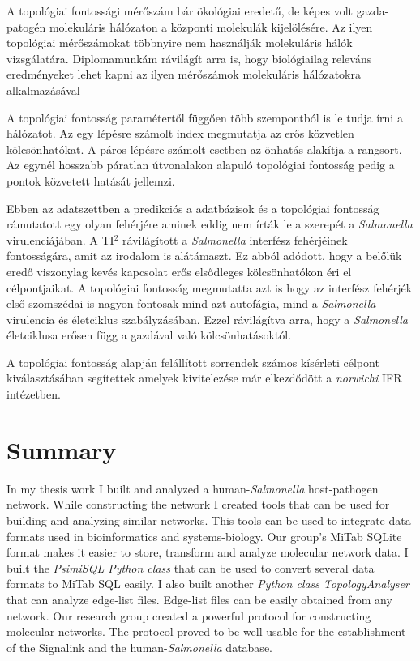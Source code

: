 \documentclass[a4paper,12pt]{article}
\begin{document}
		A topológiai fontossági mérőszám bár ökológiai eredetű, de képes volt gazda-patogén molekuláris hálózaton a központi molekulák kijelölésére. Az ilyen topológiai mérőszámokat többnyire nem használják molekuláris hálók vizsgálatára. Diplomamunkám rávilágít arra is, hogy biológiailag releváns eredményeket lehet kapni az ilyen mérőszámok molekuláris hálózatokra alkalmazásával
		
		A topológiai fontosság paramétertől függően több szempontból is le tudja írni a hálózatot. Az egy lépésre számolt index megmutatja az erős közvetlen kölcsönhatókat. A páros lépésre számolt esetben az önhatás alakítja a rangsort. Az egynél hosszabb páratlan útvonalakon alapuló topológiai fontosság pedig a pontok közvetett hatását jellemzi.
		
		Ebben az adatszettben a predikciós a adatbázisok és a topológiai fontosság rámutatott egy olyan fehérjére aminek eddig nem írták le a szerepét a \textit{Salmonella} virulenciájában. A TI$^2$ rávilágított a \textit{Salmonella} interfész fehérjéinek fontosságára, amit az irodalom is alátámaszt. Ez abból adódott, hogy a belőlük eredő viszonylag kevés kapcsolat erős elsődleges kölcsönhatókon éri el célpontjaikat. A topológiai fontosság megmutatta azt is hogy az interfész fehérjék első szomszédai is nagyon fontosak mind azt autofágia, mind a \textit{Salmonella} virulencia és életciklus szabályzásában. Ezzel rávilágítva arra, hogy a \textit{Salmonella} életciklusa erősen függ a gazdával való kölcsönhatásoktól.
		
		A topológiai fontosság alapján felállított sorrendek számos kísérleti célpont kiválasztásában segítettek amelyek kivitelezése már elkezdődött a \textit{norwichi} IFR intézetben.
		
		\pagebreak
		
		

\section{Summary}
		
		In my thesis work I built and analyzed a human-\textit{Salmonella} host-pathogen network. While constructing the network I created tools that can be used for building and analyzing similar networks. This tools can be used to integrate data formats used in bioinformatics and systems-biology. Our group's MiTab SQLite format makes it easier to  store, transform and analyze molecular network data.
		I built the \textit{PsimiSQL Python class} that can be used to convert several data formats to MiTab SQL easily. I also built another \textit{Python class} \textit{TopologyAnalyser} that can analyze edge-list files. Edge-list files can be easily obtained from any network. Our research group created a powerful protocol for constructing molecular networks. The protocol proved to be well usable for the establishment of the Signalink and the human-\textit{Salmonella} database.
		
\end{document}
